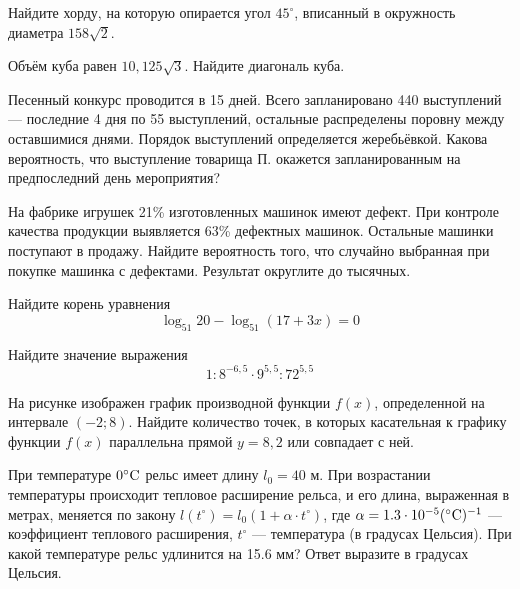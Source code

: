 
\cleardoublepage

\def\examvart{Вариант 13.1}

\normalsize



\startpartone
\large

\begin{taskBN}{1}
Найдите хорду, на которую опирается угол $45^\circ$, вписанный в окружность диаметра $158\sqrt{2}$.
\end{taskBN}

\begin{taskBN}{2}
Объём куба равен $10,125\sqrt{3}$. Найдите диагональ куба.
\end{taskBN}

\begin{taskBN}{3}
Песенный конкурс проводится в 15 дней. Всего запланировано 440 выступлений — последние 4 дня по 55 выступлений, остальные распределены поровну между оставшимися днями. Порядок выступлений определяется жеребьёвкой. Какова вероятность, что выступление товарища П. окажется запланированным на предпоследний день мероприятия?
\end{taskBN}

\begin{taskBN}{4}
На фабрике игрушек 21\% изготовленных машинок имеют дефект. При контроле качества продукции выявляется 63\% дефектных машинок. Остальные машинки поступают в продажу. Найдите вероятность того, что случайно выбранная при покупке машинка с дефектами. Результат округлите до тысячных.
\end{taskBN}

\begin{taskBN}{5}
Найдите корень уравнения $$\log_{51}20-\log_{51}(17+3x)=0$$
\end{taskBN}

\begin{taskBN}{6}
Найдите значение выражения $$1:    8^{-6,5}\cdot9^{5,5}:    72^{5,5}$$
\end{taskBN}

\begin{taskBN}{7}
    На рисунке изображен график производной функции $f(x)$, определенной на интервале $(-2; 8)$. Найдите количество точек, в которых касательная к графику функции $f(x)$ параллельна прямой $y=8{,}2$ или совпадает с ней.
\end{taskBN}

\begin{taskBN}{8}
При температуре $0^\circ {\rm{C}}$ рельс имеет длину $l_0=40$ м. При возрастании температуры происходит тепловое расширение рельса, и его длина, выраженная в метрах, меняется по закону $l(t^\circ ) = l_0 (1 + \alpha  \cdot t^\circ)$, где $\alpha=1.3\cdot 10^{-5}(^\circ {\rm{C}})^{-1}$ — коэффициент теплового расширения, $t^\circ$  — температура (в градусах Цельсия). При какой температуре рельс удлинится на 15.6 мм? Ответ выразите в градусах Цельсия.
\end{taskBN}

